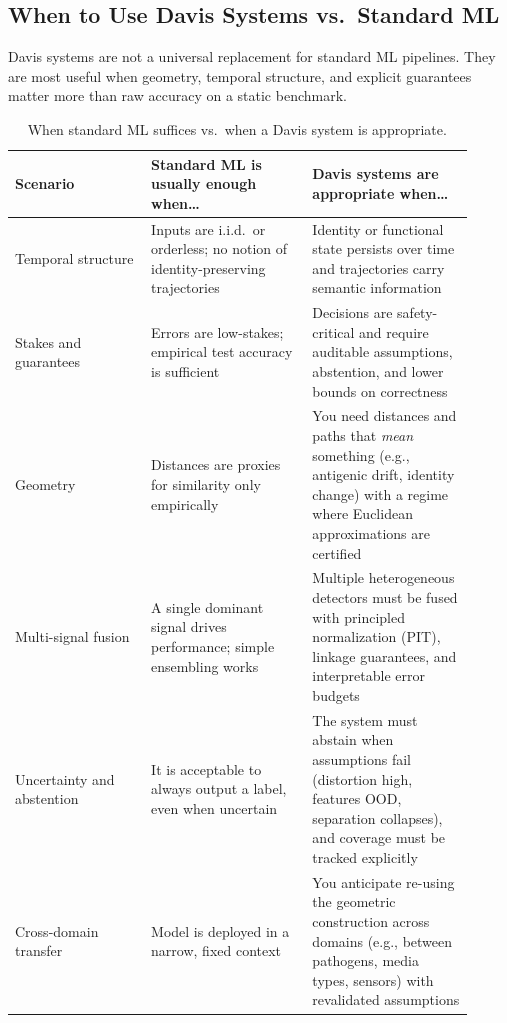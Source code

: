 \documentclass[11pt]{article}
\begin{document}
\subsection{When to Use Davis Systems vs.\ Standard ML}
\label{sec:when-to-use}

Davis systems are not a universal replacement for standard ML pipelines. They are most useful when geometry, temporal structure, and explicit guarantees matter more than raw accuracy on a static benchmark.

\begin{table}[H]
    \centering
    \caption{When standard ML suffices vs.\ when a Davis system is appropriate.}
    \label{tab:when-to-use}
    \begin{tabularx}{\linewidth}{@{}p{0.27\linewidth}p{0.32\linewidth}p{0.32\linewidth}@{}}
        \toprule
        \textbf{Scenario} & \textbf{Standard ML is usually enough when\dots} & \textbf{Davis systems are appropriate when\dots} \\
        \midrule
        Temporal structure & Inputs are i.i.d.\ or orderless; no notion of identity-preserving trajectories & Identity or functional state persists over time and trajectories carry semantic information \\
        \addlinespace[2pt]
        Stakes and guarantees & Errors are low-stakes; empirical test accuracy is sufficient & Decisions are safety-critical and require auditable assumptions, abstention, and lower bounds on correctness \\
        \addlinespace[2pt]
        Geometry & Distances are proxies for similarity only empirically & You need distances and paths that \emph{mean} something (e.g., antigenic drift, identity change) with a regime where Euclidean approximations are certified \\
        \addlinespace[2pt]
        Multi-signal fusion & A single dominant signal drives performance; simple ensembling works & Multiple heterogeneous detectors must be fused with principled normalization (PIT), linkage guarantees, and interpretable error budgets \\
        \addlinespace[2pt]
        Uncertainty and abstention & It is acceptable to always output a label, even when uncertain & The system must abstain when assumptions fail (distortion high, features OOD, separation collapses), and coverage must be tracked explicitly \\
        \addlinespace[2pt]
        Cross-domain transfer & Model is deployed in a narrow, fixed context & You anticipate re-using the geometric construction across domains (e.g., between pathogens, media types, sensors) with revalidated assumptions \\
        \bottomrule
    \end{tabularx}
\end{table}
\end{document}
